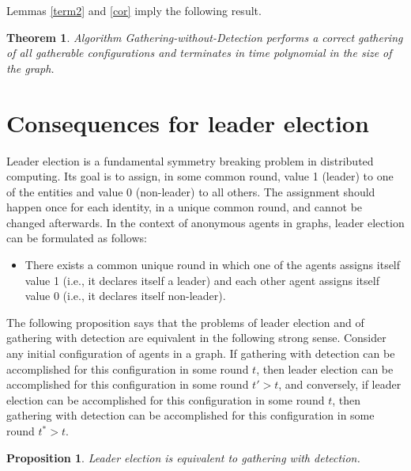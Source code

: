 \documentclass[11pt]{article}
\newtheorem{theorem}{Theorem}[section]
\newtheorem{proposition}{Proposition}[section]
\begin{document}
    Lemmas \ref{term2} and \ref{cor} imply the following result.


\begin{theorem}
Algorithm Gathering-without-Detection performs a correct gathering of all gatherable configurations and terminates in time polynomial in the size of the graph.
\end{theorem}

\section{Consequences for leader election}

Leader election \cite{Ly} is a fundamental symmetry breaking problem in distributed
computing. Its goal is to assign, in some common round, value 1 (leader) to one of the entities and value 0 (non-leader)
to all others. The assignment should happen once for each identity, in a unique common round, and cannot be changed afterwards. 
In the context of anonymous agents in graphs, leader election can be formulated
as follows:
\begin{itemize}
\item
There exists a common unique round in which one of the agents assigns itself value 1 (i.e., it declares itself a leader) and each 
other agent assigns itself value 0 (i.e., it declares itself non-leader).
\end{itemize}

The following proposition says that the problems of leader election and of gathering with detection are equivalent in the following strong sense.
Consider any  initial configuration of agents in a graph. If gathering with detection can be accomplished for this configuration in some round $t$, then
leader election can be accomplished for this configuration in some round $t'>t$, and conversely, if leader election can be accomplished for this configuration 
in some round $t$, then gathering with detection  can be accomplished for this configuration in some round $t^*>t$.
 


\begin{proposition}\label{eqbis}
Leader election is equivalent to gathering with detection.
\end{proposition}
\end{document}
